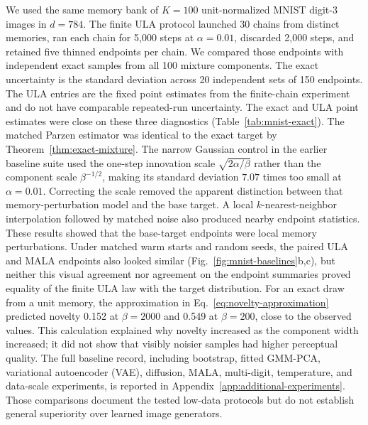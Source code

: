 We used the same memory bank of $K=100$ unit-normalized MNIST digit-3 images in
$d=784$. The finite ULA protocol launched 30 chains from distinct memories,
ran each chain for 5,000 steps at $\alpha=0.01$, discarded 2,000 steps, and
retained five thinned endpoints per chain. We compared those endpoints with
independent exact samples from all 100 mixture components. The exact uncertainty
is the standard deviation across 20 independent
sets of 150 endpoints. The ULA entries are the fixed point estimates from the
finite-chain experiment and do not have comparable repeated-run uncertainty.
The exact and ULA point estimates were close on these three diagnostics
(Table~\ref{tab:mnist-exact}). The
matched Parzen estimator was identical to the exact target by
Theorem~\ref{thm:exact-mixture}. The narrow Gaussian control in the earlier
baseline suite used the one-step innovation scale
$\sqrt{2\alpha/\beta}$ rather than the component scale $\beta^{-1/2}$, making
its standard deviation $7.07$ times too small at $\alpha=0.01$. Correcting the
scale removed the apparent distinction between that memory-perturbation model
and the base target. A local $k$-nearest-neighbor interpolation followed by
matched noise also produced nearby endpoint statistics. These results showed
that the base-target endpoints were local memory perturbations. Under matched
warm starts and random seeds, the paired ULA and MALA endpoints also looked
similar (Fig.~\ref{fig:mnist-baselines}b,c), but neither this visual agreement
nor agreement on the endpoint summaries proved equality of the finite ULA law
with the target distribution. For an exact draw from a unit memory, the approximation
in Eq.~\eqref{eq:novelty-approximation} predicted novelty 0.152 at $\beta=2000$
and 0.549 at $\beta=200$, close to the observed values. This calculation
explained why novelty increased as the component width increased; it did not
show that visibly noisier samples had higher perceptual quality. The full
baseline record, including bootstrap, fitted GMM-PCA, variational autoencoder
(VAE), diffusion, MALA, multi-digit, temperature, and data-scale experiments,
is reported in Appendix~\ref{app:additional-experiments}. Those comparisons
document the tested low-data protocols but do not establish general superiority
over learned image generators.

